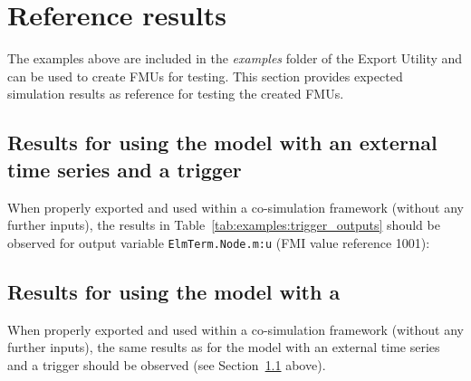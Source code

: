 \newpage

\section{Reference results}
\label{sec:examples:results}

The examples above are included in the \emph{examples} folder of the \fmipp \pf Export Utility and can be used to create FMUs for testing.
This section provides expected simulation results as reference for testing the created FMUs.

\subsection{Results for using the model with an external time series and a trigger}
\label{sec:examples:results_trigger}

When properly exported and used within a co-simulation framework (without any further inputs), the results in Table~\ref{tab:examples:trigger_outputs} should be observed for output variable \texttt{ElmTerm.Node.m:u} (FMI value reference 1001):

\begin{table}[h!]
\caption{Expected outputs from model with an external time series and a trigger.}
\label{tab:examples:trigger_outputs}
\end{table}



\subsection{Results for using the model with a \dplscript}
\label{sec:examples:results_dplscript}

When properly exported and used within a co-simulation framework (without any further inputs), the same results as for the model with an external time series and a trigger should be observed (see Section~\ref{sec:examples:results_trigger} above).


